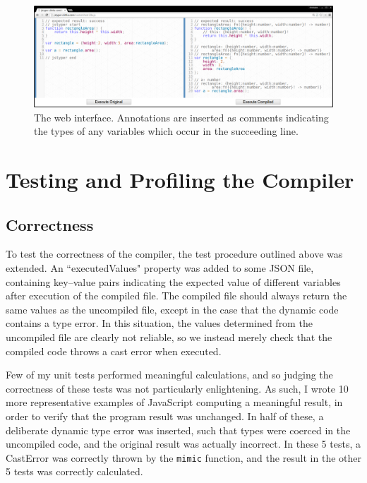 \documentclass[12pt,a4paper,twoside,openright]{report}
\theoremstyle{definition}
\theoremstyle{dotless}
\begin{document}
\begin{figure}
  \centering
  \includegraphics[width=160mm]{../res/web-interface.png}
  \caption{The web interface. Annotations are inserted as comments indicating the 
  types of any variables which occur in the succeeding line.}
  \label{fig:web-interface}
\end{figure}

\section{Testing and Profiling the Compiler}

\subsection*{Correctness}

To test the correctness of the compiler, the test procedure outlined above was
extended. An ``executedValues" property was added to some JSON file, containing
key--value pairs indicating the expected value of different variables after
execution of the compiled file. The compiled file should always return the same
values as the uncompiled file, except in the case that the dynamic code
contains a type error. In this situation, the values determined from the
uncompiled file are clearly not reliable, so we instead merely check that the
compiled code throws a cast error when executed.

Few of my unit tests performed meaningful calculations, and so judging the
correctness of these tests was not particularly enlightening. As such, I wrote
10 more representative examples of JavaScript computing a meaningful result, in
order to verify that the program result was unchanged. In half of these, a
deliberate dynamic type error was inserted, such that types were coerced in the
uncompiled code, and the original result was actually incorrect. In these 5
tests, a CastError was correctly thrown by the \texttt{mimic} function, and the
result in the other 5 tests was correctly calculated.
\end{document}

